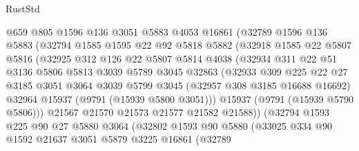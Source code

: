 \begin{lexlean}{RustStd}
\begin{coremodule}
                @659
                @805
                @1596
                @136
                @3051
                @5883
                @4053
                @16861
                (@32789
                  @1596
                  @136
                  @5883
                  (@32794
                    @1585
                    @1595
                    @22
                    @92
                    @5818
                    @5882
                    (@32918
                      @1585
                      @22
                      @5807
                      @5816
                      (@32925
                        @312
                        @126
                        @22
                        @5807
                        @5814
                        @4038
                        (@32934
                          @311
                          @22
                          @51
                          @3136
                          @5806
                          @5813
                          @3039
                          @5789
                          @3045
                          @32863
                          (@32933
                            @309
                            @225
                            @22
                            @27
                            @3185
                            @3051
                            @3064
                            @3039
                            @5799
                            @3045
                            (@32957 @308 @3185 @16688 @16692)
                            @32964
                            @15937
                            (@9791 (@15939 @5800 @3051)))
                          @15937
                          (@9791 (@15939 @5790 @5806)))
                        @21567
                        @21570
                        @21573
                        @21577
                        @21582
                        @21588))
                    (@32794
                      @1593
                      @225
                      @90
                      @27
                      @5880
                      @3064
                      (@32802
                        @1593
                        @90
                        @5880
                        (@33025
                          @334
                          @90
                          @1592
                          @21637
                          @3051
                          @5879
                          @3225
                          @16861
                          (@32789

\end{coremodule}
\end{lexlean}
